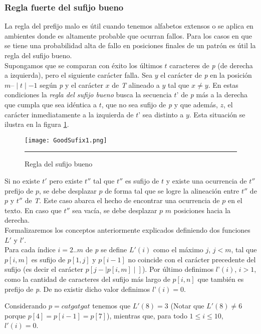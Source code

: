 \subsubsection{Regla fuerte del sufijo bueno}
La regla del prefijo malo es útil cuando tenemos alfabetos extensos o se aplica en ambientes donde es altamente probable que ocurran fallos. Para los casos en que se tiene una probabilidad alta de fallo en posiciones finales de un patrón es útil la regla del sufijo bueno.\\
Supongamos que se comparan con éxito los últimos $t$ caracteres de {\it p} (de derecha a izquierda), pero el siguiente carácter falla. Sea $y$ el carácter de {\it p} en la posición $m – \mid t \mid - 1$ según {\it p} y el carácter $x$ de {\it T} alineado a $y$ tal que $x \not= y$.
En estas condiciones la \emph{regla del sufijo bueno} busca la secuencia $t’$ de {\it p} más a la derecha que cumpla que sea idéntica a $t$, que no sea sufijo de {\it p} y que además, $z$, el carácter inmediatamente a la izquierda de $t’$ sea distinto a $y$. Esta situación se ilustra en la figura \ref{fig:goodSufix1}.
\begin{figure}[H]
	\centering
		\texttt{[image: GoodSufix1.png]}
		\rule{35em}{0.5pt}
	\caption[Regla del sufijo bueno]{Regla del sufijo bueno}
	\label{fig:goodSufix1}
\end{figure}
Si no existe $t'$ pero existe $t''$ tal que $t''$ es sufijo de $t$ y existe una ocurrencia de $t''$ prefijo de $p$, se debe desplazar $p$ de forma tal que se logre la alineación entre $t''$ de $p$ y $t''$ de {\it T}. Este caso abarca el hecho de encontrar una ocurrencia de $p$ en el texto. En caso que $t''$ sea vacía, se debe desplazar $p$ $m$ posiciones hacia la derecha.\\
Formalizaremos los conceptos anteriormente explicados definiendo dos funciones $L'$ y $l'$.\\
Para cada índice $i=2..m$ de {\it p} se define $L'(i)$ como el máximo $j$, $j<m$, tal que $p[i,m]$ es sufijo de $p[1,j]$ y $p[i-1]$ no coincide con el carácter precedente del sufijo (es decir el carácter $p[j - \mid p[i,m] \mid]$).
Por último definimos $l’(i)$, $i > 1$, como la cantidad de caracteres del sufijo más largo de $p[i,n]$ que también es prefijo de {\it p}. De no existir dicho valor definimos  $l’(i)=0$.
\begin{example*}
Considerando $p=catgatgat$ tenemos que $L'(8)=3$ (Notar que $L'(8)\not=6$ porque $p[4]= p[i-1]=p[7]$), mientras que, para todo $1 \leq i \leq 10$, $l'(i)=0$.
\end{example*}
